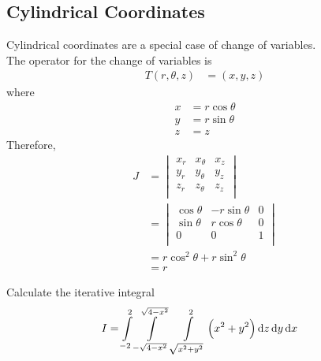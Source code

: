 \documentclass[fleqn, a4paper, 8pt, twoside]{amsart}
\theoremstyle{definition}
\theoremstyle{bluedefinition}
\theoremstyle{redtheorem}
\begin{document}
\begin{multicols}{2}
\begin{spacing}{0.7}
\subsection{Cylindrical Coordinates}

Cylindrical coordinates are a special case of change of variables.\\
The operator for the change of variables is
\begin{align*}
	T(r,\theta,z) & = (x,y,z)
\end{align*}
where
\begin{align*}
	x & = r \cos \theta \\
	y & = r \sin \theta \\
	z & = z
\end{align*}
Therefore,
\begin{align*}
	J &=
		\begin{vmatrix}
			x_r & x_{\theta} & x_z \\
			y_r & y_{\theta} & y_z \\
			z_r & z_{\theta} & z_z \\
		\end{vmatrix}\\
	  &=
		\begin{vmatrix}
			\cos \theta & -r \sin \theta & 0 \\
			\sin \theta & r \cos \theta  & 0 \\
			0           & 0              & 1 \\
		\end{vmatrix}\\
	  &= r \cos^2 \theta + r \sin^2 \theta\\
	  &= r
\end{align*}

\begin{question}
	Calculate the iterative integral
	\begin{align*}
		I & = \int\limits_{-2}^{2} \int\limits_{-\sqrt{4 - x^2}}^{\sqrt{4 - x^2}} \int\limits_{\sqrt{x^2 + y^2}}^{2} \left( x^2 + y^2 \right) \dif z \dif y \dif x
	\end{align*}
\end{question}


\end{spacing}
\end{multicols}
\end{document}
